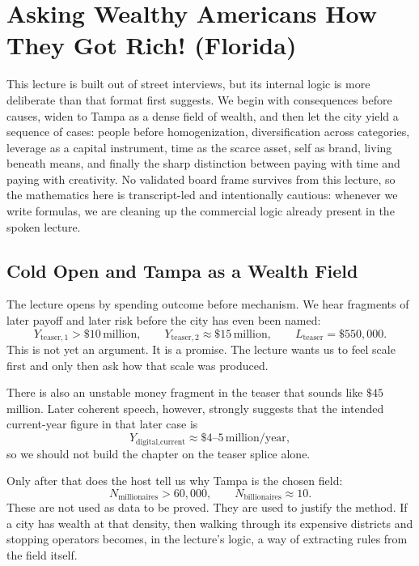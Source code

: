 \chapter{Asking Wealthy Americans How They Got Rich! (Florida)}

This lecture is built out of street interviews, but its internal logic is more deliberate than that format first suggests. We begin with consequences before causes, widen to Tampa as a dense field of wealth, and then let the city yield a sequence of cases: people before homogenization, diversification across categories, leverage as a capital instrument, time as the scarce asset, self as brand, living beneath means, and finally the sharp distinction between paying with time and paying with creativity. No validated board frame survives from this lecture, so the mathematics here is transcript-led and intentionally cautious: whenever we write formulas, we are cleaning up the commercial logic already present in the spoken lecture.

\section{Cold Open and Tampa as a Wealth Field}

The lecture opens by spending outcome before mechanism. We hear fragments of later payoff and later risk before the city has even been named:
\begin{equation}
Y_{\text{teaser},1} > \$10\,\text{million},\qquad
Y_{\text{teaser},2} \approx \$15\,\text{million},\qquad
L_{\text{teaser}} = \$550{,}000.
\end{equation}
This is not yet an argument. It is a promise. The lecture wants us to feel scale first and only then ask how that scale was produced.

There is also an unstable money fragment in the teaser that sounds like \(\$45\) million. Later coherent speech, however, strongly suggests that the intended current-year figure in that later case is
\begin{equation}
Y_{\text{digital,current}} \approx \$4\text{--}5\,\text{million/year},
\end{equation}
so we should not build the chapter on the teaser splice alone.

Only after that does the host tell us why Tampa is the chosen field:
\begin{equation}
N_{\text{millionaires}} > 60{,}000,\qquad
N_{\text{billionaires}} \approx 10.
\end{equation}
These are not used as data to be proved. They are used to justify the method. If a city has wealth at that density, then walking through its expensive districts and stopping operators becomes, in the lecture's logic, a way of extracting rules from the field itself.

